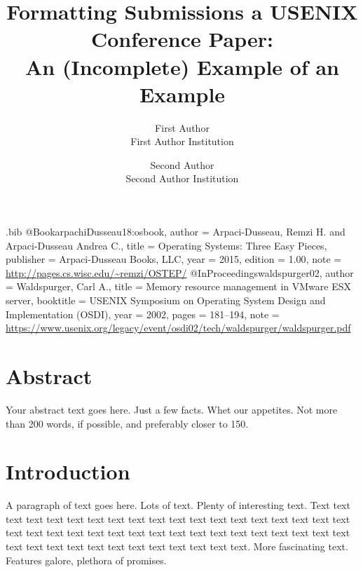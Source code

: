 
\usepackage{../style/usenix}
\usepackage{lipsum}
\usepackage{tikz}
\usepackage{amsmath}

\begin{filecontents}{\jobname.bib}
@Book{arpachiDusseau18:osbook,
  author =       {Arpaci-Dusseau, Remzi H. and Arpaci-Dusseau Andrea C.},
  title =        {Operating Systems: Three Easy Pieces},
  publisher =    {Arpaci-Dusseau Books, LLC},
  year =         2015,
  edition =      {1.00},
  note =         {\url{http://pages.cs.wisc.edu/~remzi/OSTEP/}}
}
@InProceedings{waldspurger02,
  author =       {Waldspurger, Carl A.},
  title =        {Memory resource management in {VMware ESX} server},
  booktitle =    {USENIX Symposium on Operating System Design and
                  Implementation (OSDI)},
  year =         2002,
  pages =        {181--194},
  note =         {\url{https://www.usenix.org/legacy/event/osdi02/tech/waldspurger/waldspurger.pdf}}}
\end{filecontents}


\title{
    Formatting Submissions a USENIX Conference Paper:\\
    An (Incomplete) Example of an Example}
\date{}
\author{
    First Author\\
    First Author Institution\\
    \and
    Second Author\\
    Second Author Institution\\}
\maketitle

\section*{\centering Abstract}
\vspace{-0.1in}
Your abstract text goes here. Just a few facts. Whet our appetites.
Not more than 200 words, if possible, and preferably closer to 150.

\section{Introduction}
A paragraph of text goes here. Lots of text. Plenty of interesting
text. Text text text text text text text text text text text text text
text text text text text text text text text text text text text text
text text text text text text text text text text text text text text
text text text text text text text.
More fascinating text. Features galore, plethora of promises.

